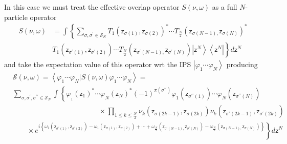 \documentclass[aps,preprint]{revtex4}%
\begin{document}
In this case we must treat the effective overlap operator $S\left(  \nu
,\omega\right)  $ as a full $N$-particle operator
\begin{align}
S\left(  \nu,\omega\right)   &  =\int\left\{
{\textstyle\sum\limits_{\sigma,\sigma^{\prime}\in\mathcal{S}_{N}}}
T_{1}\left(  \mathsf{z}_{\sigma\left(  1\right)  },\mathsf{z}_{\sigma\left(
2\right)  }\right)  ^{\ast}\cdots T_{\frac{N}{2}}\left(  \mathsf{z}%
_{\sigma\left(  N-1\right)  ,}\mathsf{z}_{\sigma\left(  N\right)  }\right)
^{\ast}\right. \nonumber\\
&  \left.  T_{1}\left(  \mathsf{z}_{\sigma^{\prime}\left(  1\right)
},\mathsf{z}_{\sigma^{\prime}\left(  2\right)  }\right)  \cdots T_{\frac{N}%
{2}}\left(  \mathsf{z}_{\sigma^{\prime}\left(  N-1\right)  ,}\mathsf{z}%
_{\sigma^{\prime}\left(  N\right)  }\right)  \left\vert \mathsf{z}%
^{N}\right\rangle \left\langle \mathsf{z}^{N}\right\vert \right\}
d\mathsf{z}^{N}%
\end{align}
and take the expectation value of this operator wrt the IPS $\left\vert
\varphi_{1}\cdots\varphi_{N}\right\rangle $ producing
\begin{align}
&  \mathcal{S}\left(  \nu,\omega\right)  =\left\langle \varphi_{1}%
\cdots\varphi_{N}|S\left(  \nu,\omega\right)  \varphi_{1}\cdots\varphi
_{N}\right\rangle =\nonumber\\
&
{\textstyle\sum\limits_{\sigma,\sigma^{\prime},\sigma^{\prime\prime}%
\in\mathcal{S}_{N}}}
{\displaystyle\int}
\left\{  \varphi_{_{1}}\left(  \mathsf{z}_{1}\right)  ^{\ast}\cdots\varphi
_{N}\left(  \mathsf{z}_{N}\right)  ^{\ast}\left(  -1\right)  ^{\pi\left(
\sigma^{\prime\prime}\right)  }\varphi_{1}\left(  \mathsf{z}_{\sigma
^{\prime\prime}\left(  1\right)  }\right)  \cdots\varphi_{N}\left(
\mathsf{z}_{\sigma^{\prime\prime}\left(  N\right)  }\right)  \right.
\nonumber\\
&  \qquad\qquad\qquad\qquad\qquad\qquad\times%
{\displaystyle\prod\limits_{1\leq k\leq\frac{N}{2}}}
\nu_{k}\left(  \mathsf{z}_{\sigma\left(  2k-1\right)  },\mathsf{z}%
_{\sigma\left(  2k\right)  }\right)  \nu_{k}\left(  \mathsf{z}_{\sigma
^{\prime}\left(  2k-1\right)  },\mathsf{z}_{\sigma^{\prime}\left(  2k\right)
}\right) \nonumber\\
&  \qquad\times\left.  e^{i\left\{  \omega_{1}\left(  \mathsf{z}%
_{\sigma^{\prime}\left(  1\right)  },\mathsf{z}_{\sigma^{\prime}\left(
2\right)  }\right)  -\omega_{1}\left(  \mathsf{z}_{\sigma\left(  1\right)
},\mathsf{z}_{\sigma\left(  2\right)  }\right)  +\cdots+\omega_{\frac{N}{2}%
}\left(  \mathsf{z}_{\sigma^{\prime}\left(  N-1\right)  ,}\mathsf{z}%
_{\sigma^{\prime}\left(  N\right)  }\right)  -\omega_{\frac{N}{2}}\left(
\mathsf{z}_{\sigma\left(  N-1\right)  ,}\mathsf{z}_{\sigma\left(  N\right)
}\right)  \right\}  }\right\}  d\mathsf{z}^{N}%
\end{align}
\end{document}
